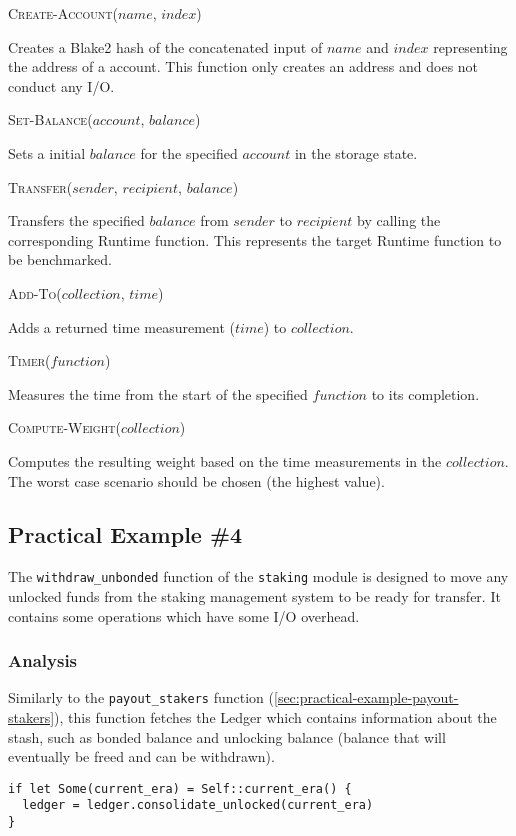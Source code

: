 \documentclass[11pt,a4paper]{article}
\newcommand{\SubItem}[1]{
    {\setlength\itemindent{15pt} \item[-] #1}
}
\begin{document}
\begin{itemize}
  \item \textsc{Create-Account($name$, $index$)} \SubItem{Creates a Blake2 hash
      of the concatenated input of $name$ and $index$ representing the address
      of a account. This function only creates an address and does not conduct
      any I/O.}
  \item \textsc{Set-Balance($account$, $balance$)} \SubItem{Sets a initial
      $balance$ for the specified $account$ in the storage state.}
  \item \textsc{Transfer($sender$, $recipient$, $balance$)} \SubItem{Transfers
      the specified $balance$ from $sender$ to $recipient$ by calling the
      corresponding Runtime function. This represents the target Runtime
      function to be benchmarked.}
  \item \textsc{Add-To($collection$, $time$)} \SubItem{Adds a returned time
      measurement ($time$) to $collection$.}
  \item \textsc{Timer($function$)} \SubItem{Measures the time from the start of
      the specified $function$ to its completion.}
  \item \textsc{Compute-Weight($collection$)}
  \SubItem{Computes the resulting weight based on the time measurements in the
  $collection$. The worst case scenario should be chosen (the highest value).}
\end{itemize}

\subsection{Practical Example \#4}

The \verb|withdraw_unbonded| function of the \verb|staking| module is designed to
move any unlocked funds from the staking management system to be ready for
transfer. It contains some operations which have some I/O overhead.

\subsubsection{Analysis}

Similarly to the \verb|payout_stakers| function
(\ref{sec:practical-example-payout-stakers}), this function fetches the Ledger
which contains information about the stash, such as bonded balance and unlocking
balance (balance that will eventually be freed and can be withdrawn).

\begin{verbatim}
if let Some(current_era) = Self::current_era() {
  ledger = ledger.consolidate_unlocked(current_era)
}
\end{verbatim}
\end{document}
